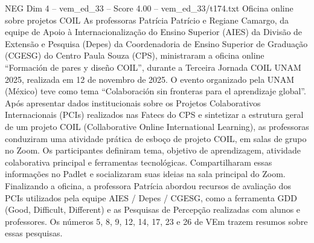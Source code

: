\begin{textsample}{NEG Dim 4 – vem\_ed\_33 – Score 4.00 – vem\_ed\_33/t174.txt}  \label{ex:f4_neg_045}
Oficina online sobre projetos COIL As professoras Patrícia Patrício e Regiane Camargo, da equipe de Apoio à Internacionalização do Ensino Superior (AIES) da Divisão de Extensão e Pesquisa (Depes) da Coordenadoria de Ensino Superior de Graduação (CGESG) do Centro Paula Souza (CPS), ministraram a oficina online “Formación de pares y diseño COIL”, durante a Terceira Jornada COIL UNAM 2025, realizada em 12 de novembro de 2025.
O evento organizado pela UNAM (México) teve como tema “Colaboración sin fronteras para el aprendizaje global”.
Após apresentar dados institucionais sobre os Projetos Colaborativos Internacionais (PCIs) realizados nas Fatecs do CPS e sintetizar a estrutura geral de um projeto COIL (Collaborative Online International Learning), as professoras conduziram uma atividade prática de esboço de projeto COIL, em salas de grupo no Zoom.
Os participantes definiram tema, objetivo de aprendizagem, atividade colaborativa principal e ferramentas tecnológicas.
Compartilharam essas informações no Padlet e socializaram suas ideias na sala principal do Zoom.
Finalizando a oficina, a professora Patrícia abordou recursos de avaliação dos PCIs utilizados pela equipe AIES / Depes / CGESG, como a ferramenta GDD (Good, Difficult, Different) e as Pesquisas de Percepção realizadas com alunos e professores.
Os números 5, 8, 9, 12, 14, 17, 23 e 26 de VEm trazem resumos sobre essas pesquisas.

\end{textsample}
